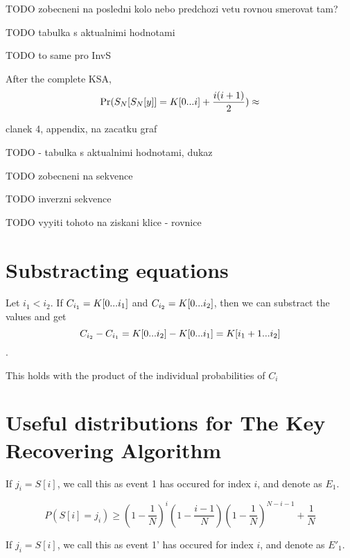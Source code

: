 	\begin{cor}
		TODO zobecneni na posledni kolo nebo predchozi vetu rovnou smerovat tam?
\end{cor}
	
TODO tabulka s aktualnimi hodnotami 

TODO to same pro InvS


\begin{thm}
	After the complete KSA, 
	\[  \Pr(S_{N}[S_{N}[y]] = K[{0}...{i}] + \dfrac{i(i+1)}{2}) \approx  \]
	
	clanek 4, appendix, na zacatku graf
\end{thm}

TODO - tabulka s aktualnimi hodnotami, dukaz




TODO zobecneni na sekvence


TODO inverzni sekvence

TODO vyyiti tohoto na ziskani klice - rovnice


\section{Substracting equations}

Let $i_{1} < i_{2} $. If $ C_{i_{1}} = K[{0}...{i_{1}}] $ and $ C_{i_{2}} = K[{0}...{i_{2}}] $, then we can substract the values and get
\[ C_{i_{2}} - C_{i_{1}} = K[{0}...{i_{2}}] - K[{0}...{i_{1}}] = K[{i_{1} + 1}...{i_{2}}]	\].

This holds with the product of the individual probabilities of $ C_{i} $


\section{Useful distributions for The Key Recovering Algorithm}

\begin{defn}
If $ j_{i} = S[i] $, we call this as event 1 has occured for index $ i $, and denote as $ E_{1} $.
\end{defn}

\begin{thm}
\[	P(S[i] = j_{i}) \geq (1-\dfrac{1}{N})^{i}(1-\dfrac{i-1}{N})(1-\dfrac{1}{N})^{N-i-1}+ \dfrac{1}{N} \]
\end{thm}

\begin{defn}
	If $ j_{i} = S[i] $, we call this as event 1' has occured for index $ i $, and denote as $ E'_{1} $.
\end{defn}

